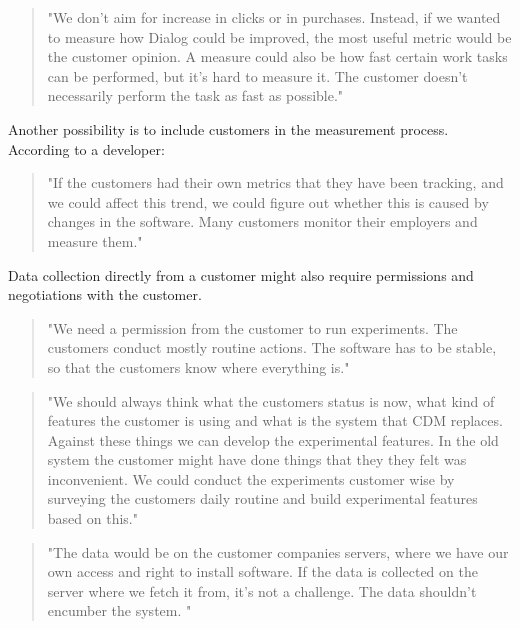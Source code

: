 \documentclass[english]{tktltiki2}
\theoremstyle{definition}
\theoremstyle{remark}
\begin{document}
\begin{quote}
"We don't aim for increase in clicks or in purchases. Instead, if we wanted to measure how Dialog could be improved, the most useful metric would be the customer opinion. A measure could also be how fast certain work tasks can be performed, but it's hard to measure it. The customer doesn't necessarily perform the task as fast as possible."
\end{quote}

Another possibility is to include customers in the measurement process. According to a developer:

\begin{quote}
"If the customers had their own metrics that they have been tracking, and we could affect this trend, we could figure out whether this is caused by changes in the software. Many customers monitor their employers and measure them."
\end{quote}

Data collection directly from a customer might also require permissions and negotiations with the customer. 

\begin{quote}
"We need a permission from the customer to run experiments. The customers conduct mostly routine actions. The software has to be stable, so that the customers know where everything is."
\end{quote}

\begin{quote}
"We should always think what the customers status is now, what kind of features the customer is using and what is the system that CDM replaces. Against these things we can develop the experimental features. In the old system the customer might have done things that they they felt was inconvenient. We could conduct the experiments customer wise by surveying the customers daily routine and build experimental features based on this."
\end{quote}

\begin{quote}
"The data would be on the customer companies servers, where we have our own access and right to install software. If the data is collected on the server where we fetch it from, it's not a challenge. The data shouldn't encumber the system. "
\end{quote}
\end{document}
